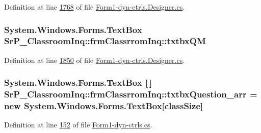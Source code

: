 \-Definition at line \hyperlink{_form1-dyn-ctrls_8_designer_8cs_source_l01768}{1768} of file \hyperlink{_form1-dyn-ctrls_8_designer_8cs_source}{\-Form1-\/dyn-\/ctrls.\-Designer.\-cs}.

\hypertarget{class_sr_p___classroom_inq_1_1frm_classrrom_inq_a4a85095c6aa75b21689e40d7dc78ace6}{
\subsubsection[{txtbx\-Q\-M}]{\setlength{\rightskip}{0pt plus 5cm}\-System.\-Windows.\-Forms.\-Text\-Box {\bf \-Sr\-P\-\_\-\-Classroom\-Inq\-::frm\-Classrrom\-Inq\-::txtbx\-Q\-M}}}
\label{class_sr_p___classroom_inq_1_1frm_classrrom_inq_a4a85095c6aa75b21689e40d7dc78ace6}


\-Definition at line \hyperlink{_form1-dyn-ctrls_8_designer_8cs_source_l01850}{1850} of file \hyperlink{_form1-dyn-ctrls_8_designer_8cs_source}{\-Form1-\/dyn-\/ctrls.\-Designer.\-cs}.

\hypertarget{class_sr_p___classroom_inq_1_1frm_classrrom_inq_ac8b5f7f10341c6c43066881afcbbcaaa}{
\subsubsection[{txtbx\-Question\-\_\-arr}]{\setlength{\rightskip}{0pt plus 5cm}\-System.\-Windows.\-Forms.\-Text\-Box \mbox{[}$\,$\mbox{]} {\bf \-Sr\-P\-\_\-\-Classroom\-Inq\-::frm\-Classrrom\-Inq\-::txtbx\-Question\-\_\-arr} = new \-System.\-Windows.\-Forms.\-Text\-Box\mbox{[}{\bf class\-Size}\mbox{]}}}
\label{class_sr_p___classroom_inq_1_1frm_classrrom_inq_ac8b5f7f10341c6c43066881afcbbcaaa}


\-Definition at line \hyperlink{_form1-dyn-ctrls_8cs_source_l00152}{152} of file \hyperlink{_form1-dyn-ctrls_8cs_source}{\-Form1-\/dyn-\/ctrls.\-cs}.

